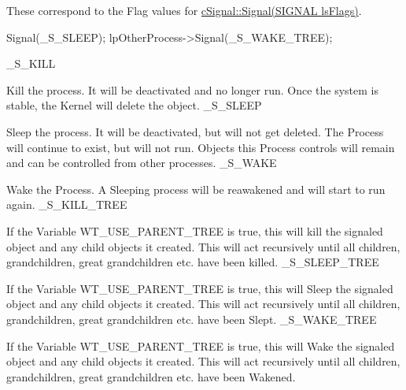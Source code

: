 These correspond to the Flag values for \hyperlink{classc_signal_a77af8271fc7ffb8696ba73a01e213808}{cSignal::Signal(SIGNAL lsFlags)}. 
\begin{DoxyCode}
 Signal(_S_SLEEP);
 lpOtherProcess->Signal(_S_WAKE_TREE);
\end{DoxyCode}


\_\-S\_\-KILL
\begin{DoxyItemize}
\item Kill the process. It will be deactivated and no longer run. Once the system is stable, the Kernel will delete the object. \_\-S\_\-SLEEP
\item Sleep the process. It will be deactivated, but will not get deleted. The Process will continue to exist, but will not run. Objects this Process controls will remain and can be controlled from other processes. \_\-S\_\-WAKE
\item Wake the Process. A Sleeping process will be reawakened and will start to run again. \_\-S\_\-KILL\_\-TREE
\item If the Variable WT\_\-USE\_\-PARENT\_\-TREE is true, this will kill the signaled object and any child objects it created. This will act recursively until all children, grandchildren, great grandchildren etc. have been killed. \_\-S\_\-SLEEP\_\-TREE
\item If the Variable WT\_\-USE\_\-PARENT\_\-TREE is true, this will Sleep the signaled object and any child objects it created. This will act recursively until all children, grandchildren, great grandchildren etc. have been Slept. \_\-S\_\-WAKE\_\-TREE
\item If the Variable WT\_\-USE\_\-PARENT\_\-TREE is true, this will Wake the signaled object and any child objects it created. This will act recursively until all children, grandchildren, great grandchildren etc. have been Wakened. 
\end{DoxyItemize}